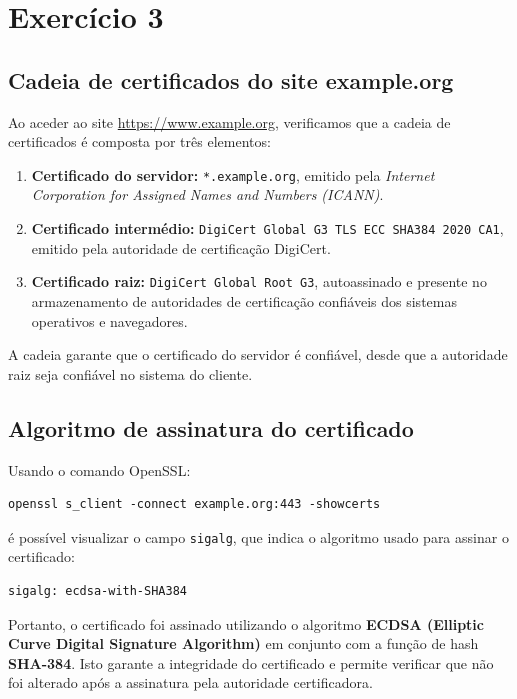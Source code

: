 \chapter{Exercício 3}
\label{cha:exercise_3}

\section{Cadeia de certificados do site example.org}

Ao aceder ao site \url{https://www.example.org}, verificamos que a cadeia de certificados é composta por três elementos:

\begin{enumerate}
  \item \textbf{Certificado do servidor:} \texttt{*.example.org}, emitido pela \textit{Internet Corporation for Assigned Names and Numbers (ICANN)}.
  \item \textbf{Certificado intermédio:} \texttt{DigiCert Global G3 TLS ECC SHA384 2020 CA1}, emitido pela autoridade de certificação DigiCert.
  \item \textbf{Certificado raiz:} \texttt{DigiCert Global Root G3}, autoassinado e presente no armazenamento de autoridades de certificação confiáveis dos sistemas operativos e navegadores.
\end{enumerate}

A cadeia garante que o certificado do servidor é confiável, desde que a autoridade raiz seja confiável no sistema do cliente.

\section{Algoritmo de assinatura do certificado}

Usando o comando OpenSSL:

\begin{verbatim}
openssl s_client -connect example.org:443 -showcerts
\end{verbatim}

é possível visualizar o campo \texttt{sigalg}, que indica o algoritmo usado para assinar o certificado:

\begin{verbatim}
sigalg: ecdsa-with-SHA384
\end{verbatim}

Portanto, o certificado foi assinado utilizando o algoritmo \textbf{ECDSA (Elliptic Curve Digital Signature Algorithm)} em conjunto com a função de hash \textbf{SHA-384}.
Isto garante a integridade do certificado e permite verificar que não foi alterado após a assinatura pela autoridade certificadora.